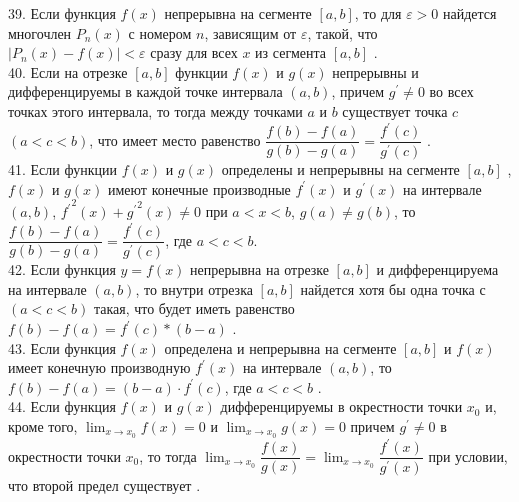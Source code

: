 \documentclass[12pt]{article}
\begin{document}
39. Если функция ${\displaystyle f(x)}$ непрерывна на сегменте ${\displaystyle [a,b]}$, то для ${\displaystyle \varepsilon>0}$ найдется многочлен ${\displaystyle P_n(x)}$ с номером ${\displaystyle n}$, зависящим от ${\displaystyle \varepsilon}$, такой, что ${\displaystyle |P_n(x)-f(x)|<\varepsilon}$ сразу для всех ${\displaystyle x}$ из сегмента ${\displaystyle [a,b]}$ .\\

40. Если на отрезке ${\displaystyle [a,b]}$ функции ${\displaystyle f(x)}$ и ${\displaystyle g(x)}$ непрерывны и дифференцируемы в каждой точке интервала ${\displaystyle (a,b)}$, причем  ${\displaystyle g^{\prime}\neq 0}$ во всех точках этого интервала, то тогда между точками ${\displaystyle a}$ и  ${\displaystyle b}$ существует точка ${\displaystyle c}$ ${\displaystyle (a<c<b)}$, что имеет место равенство ${\displaystyle \dfrac{f(b)-f(a)}{g(b)-g(a)}=\dfrac{f^{\prime}(c)}{g^{\prime}(c)}}$ .\\

41. Если функции ${\displaystyle f(x)}$ и ${\displaystyle g(x)}$ определены и непрерывны на сегменте ${\displaystyle [a,b]}$ , ${\displaystyle f(x)}$ и ${\displaystyle g(x)}$ имеют конечные производные ${\displaystyle f^{\prime}(x)}$  и ${\displaystyle g^{\prime}(x)}$ на интервале ${\displaystyle (a,b)}$, ${\displaystyle {f^{\prime}}^2(x)+{g^{\prime}}^2(x) \neq 0}$ при ${\displaystyle a<x<b}$, ${\displaystyle g(a)\neq g(b)}$, то ${\displaystyle \dfrac{f(b)-f(a)}{g(b)-g(a)}=\dfrac{f^{\prime}(c)}{g^{\prime}(c)}}$, где ${\displaystyle a<c<b}$.\\

42. Если функция ${\displaystyle y=f(x)}$ непрерывна на отрезке ${\displaystyle [a,b]}$ и дифференцируема на интервале ${\displaystyle (a,b)}$, то внутри отрезка ${\displaystyle [a,b]}$ найдется хотя бы одна точка ${\displaystyle с}$ ${(\displaystyle a<c<b)}$ такая, что будет иметь равенство ${\displaystyle f(b)-f(a)=f^{\prime}(c)*(b-a)}$ .\\

43. Если функция ${\displaystyle f(x)}$ определена и непрерывна на сегменте ${\displaystyle [a,b]}$ и ${\displaystyle f(x)}$ имеет конечную производную ${\displaystyle f^{\prime}(x)}$ на интервале ${\displaystyle (a,b)}$, то ${\displaystyle f(b)-f(a)=(b-a)\cdot f^{\prime}(c)}$, где ${\displaystyle a<c<b}$ .\\

44. Если функция ${\displaystyle f(x)}$ и ${\displaystyle g(x)}$ дифференцируемы в окрестности точки ${\displaystyle x_0}$ и, кроме того, ${\displaystyle \lim _{x \to x_0} f(x)=0}$ и ${\displaystyle \lim _{x \to x_0} g(x)=0}$ причем ${\displaystyle g^{\prime}\neq 0}$ в окрестности точки ${\displaystyle x_0}$, то тогда ${\displaystyle \lim _{x \to x_0} \dfrac{f(x)}{g(x)}=\lim _{x \to x_0} \dfrac{f^{\prime}(x)}{g^{\prime}(x)}}$ при условии, что второй предел существует .\\
\end{document}
